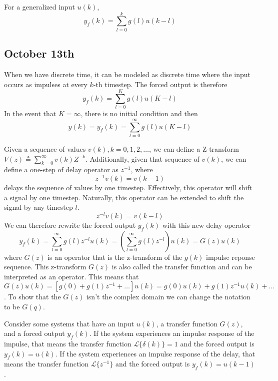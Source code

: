 \documentclass[11pt]{article}
\begin{document}
For a generalized input $u(k)$,
\begin{equation}
    y_f(k) = \sum_{l = 0}^k g(l) u(k-l)
\end{equation}

\subsection{October 13th}
When we have discrete time, it can be modeled as discrete time where the input occurs as impulses at every $k$-th timestep.
The forced output is therefore
\begin{equation}
    y_f(k) = \sum_{l=0}^{K} g(l) u(K-l)
\end{equation}
In the event that $K=\infty$, there is no initial condition and then
\begin{equation}
    y(k) = y_f(k) = \sum_{l=0}^{\infty} g(l) u(K-l)
\end{equation}

Given a sequence of values $v(k), k=0,1,2,\dots$, we can define a Z-transform $V(z) \triangleq \sum_{k=0}^{\infty} v(k) Z^{-k}$.
Additionally, given that sequence of $v(k)$, we can define a one-step of delay operator as $z^{-1}$, where
\begin{equation}
    z^{-1} v(k) = v(k-1)
\end{equation}
delays the sequence of values by one timestep. 
Effectively, this operator will shift a signal by one timestep.
Naturally, this operator can be extended to shift the signal by any timestep $l$.
\begin{equation}
    z^{-l} v(k) = v(k-l)
\end{equation}
We can therefore rewrite the forced output $y_f(k)$ with this new delay operator
\begin{equation}
    y_f(k) = \sum_{l=0}^{\infty} g(l) z^{-l} u(k) =  (\sum_{l=0}^{\infty} g(l) z^{-l}) u(k) = G(z) u(k)
\end{equation}
where $G(z)$ is an operator that is the z-transform of the $g(k)$ impulse reponse sequence.
This z-transform $G(z)$ is also called the transfer function and can be interpreted as an operator.
This means that $G(z) u(k) = [g(0) + g(1) z^{-1} + \dots] u(k) = g(0) u(k)+ g(1) z^{-1} u(k) + \dots$.
To show that the $G(z)$ isn't the complex domain we can change the notation to be $G(q)$.

Consider some systems that have an input $u(k)$, a transfer function $G(z)$, and a forced output $y_f(k)$.
If the system experiences an impulse response of the impulse, that means the transfer function $\mathcal{L}\{ \delta(k) \} = 1$ and the forced output is $y_f(k) = u(k)$.
If the system experiences an impulse response of the delay, that means the transfer function $\mathcal{L}\{ z^{-1} \}$ and the forced output is $y_f(k) = u(k-1)$.
\end{document}
